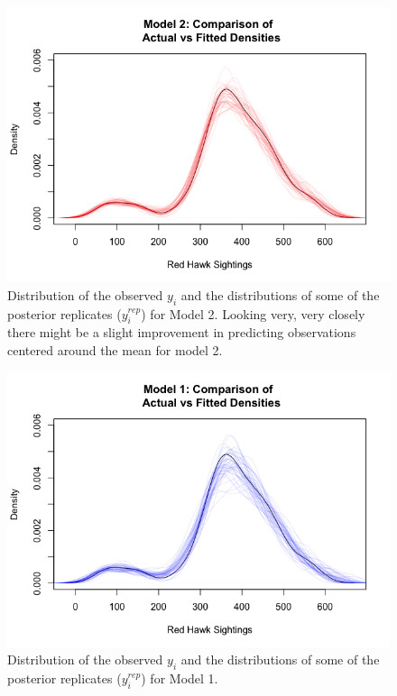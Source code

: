 \documentclass{asaproc}
\begin{document}
\begin{figure}[h!]
    \centering
    \includegraphics[scale=0.35]{FittedVReps.png}
    \caption{Distribution of the observed $y_i$ and the distributions of some of the posterior replicates ($y_i^{rep}$) for Model 2. Looking very, very closely there might be a slight improvement in predicting observations centered around the mean for model 2.}
    \label{M2_reps}
\end{figure}

\begin{figure}[h!]
    \centering
    \includegraphics[scale=0.35]{m1_reps.png}
    \caption{Distribution of the observed $y_i$ and the distributions of some of the posterior replicates ($y_i^{rep}$) for Model 1.}
    \label{M1_reps}
\end{figure}
\end{document}
